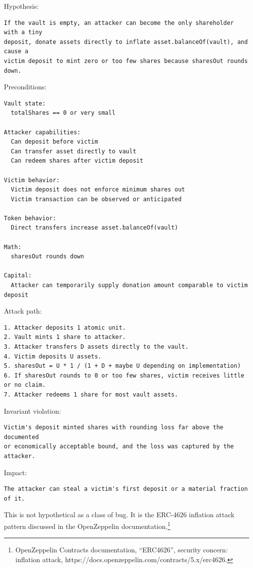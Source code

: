 Hypothesis:

\begin{lstlisting}
If the vault is empty, an attacker can become the only shareholder with a tiny
deposit, donate assets directly to inflate asset.balanceOf(vault), and cause a
victim deposit to mint zero or too few shares because sharesOut rounds down.
\end{lstlisting}

Preconditions:

\begin{lstlisting}
Vault state:
  totalShares == 0 or very small

Attacker capabilities:
  Can deposit before victim
  Can transfer asset directly to vault
  Can redeem shares after victim deposit

Victim behavior:
  Victim deposit does not enforce minimum shares out
  Victim transaction can be observed or anticipated

Token behavior:
  Direct transfers increase asset.balanceOf(vault)

Math:
  sharesOut rounds down

Capital:
  Attacker can temporarily supply donation amount comparable to victim deposit
\end{lstlisting}

Attack path:

\begin{lstlisting}
1. Attacker deposits 1 atomic unit.
2. Vault mints 1 share to attacker.
3. Attacker transfers D assets directly to the vault.
4. Victim deposits U assets.
5. sharesOut = U * 1 / (1 + D + maybe U depending on implementation)
6. If sharesOut rounds to 0 or too few shares, victim receives little or no claim.
7. Attacker redeems 1 share for most vault assets.
\end{lstlisting}

Invariant violation:

\begin{lstlisting}
Victim's deposit minted shares with rounding loss far above the documented
or economically acceptable bound, and the loss was captured by the attacker.
\end{lstlisting}

Impact:

\begin{lstlisting}
The attacker can steal a victim's first deposit or a material fraction of it.
\end{lstlisting}

This is not hypothetical as a class of bug. It is the ERC-4626 inflation
attack pattern discussed in the OpenZeppelin documentation.\footnote{OpenZeppelin
  Contracts documentation, ``ERC4626'', security concern: inflation
  attack, https://docs.openzeppelin.com/contracts/5.x/erc4626.}

